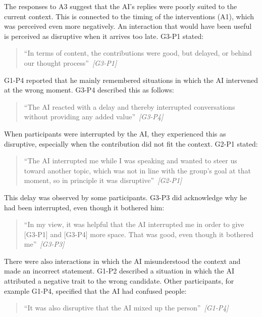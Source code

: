 The responses to A3 suggest that the AI's replies were poorly suited to the current context.
This is connected to the timing of the interventions (A1), which was perceived even more negatively.
An interaction that would have been useful is perceived as disruptive when it arrives too late.
G3-P1 stated:
{\setlength{\topsep}{0.25\baselineskip}\setlength{\partopsep}{0pt}%
  \begin{quote}\small
    \enquote{In terms of content, the contributions were good, but delayed, or behind our thought
    process}~\textit{\scriptsize[G3-P1]}
\end{quote}}
G1-P4 reported that he mainly remembered situations in which the AI intervened at the wrong moment.
G3-P4 described this as follows:
{\setlength{\topsep}{0.25\baselineskip}\setlength{\partopsep}{0pt}%
  \begin{quote}\small
    \enquote{The AI reacted with a delay and thereby interrupted conversations without providing any
    added value}~\textit{\scriptsize[G3-P4]}
\end{quote}}
When participants were interrupted by the AI, they experienced this as disruptive, especially when the
contribution did not fit the context.
G2-P1 stated:
{\setlength{\topsep}{0.25\baselineskip}\setlength{\partopsep}{0pt}%
  \begin{quote}\small
    \enquote{The AI interrupted me while I was speaking and wanted to steer us toward another topic,
      which was not in line with the group's goal at that moment, so in principle it was
    disruptive}~\textit{\scriptsize[G2-P1]}
\end{quote}}
This delay was observed by some participants.
G3-P3 did acknowledge why he had been interrupted, even though it bothered him:
{\setlength{\topsep}{0.25\baselineskip}\setlength{\partopsep}{0pt}%
  \begin{quote}\small
    \enquote{In my view, it was helpful that the AI interrupted me in order to give
      [G3-P1] and [G3-P4] more space. That was good, even though it bothered
    me}~\textit{\scriptsize[G3-P3]}
\end{quote}}
There were also interactions in which the AI misunderstood the context and made an incorrect statement.
G1-P2 described a situation in which the AI attributed a negative trait to the wrong candidate.
Other participants, for example G1-P4, specified that the AI had confused people:
{\setlength{\topsep}{0.25\baselineskip}\setlength{\partopsep}{0pt}%
  \begin{quote}\small
    \enquote{It was also disruptive that the AI mixed up the person}~\textit{\scriptsize[G1-P4]}
\end{quote}}

